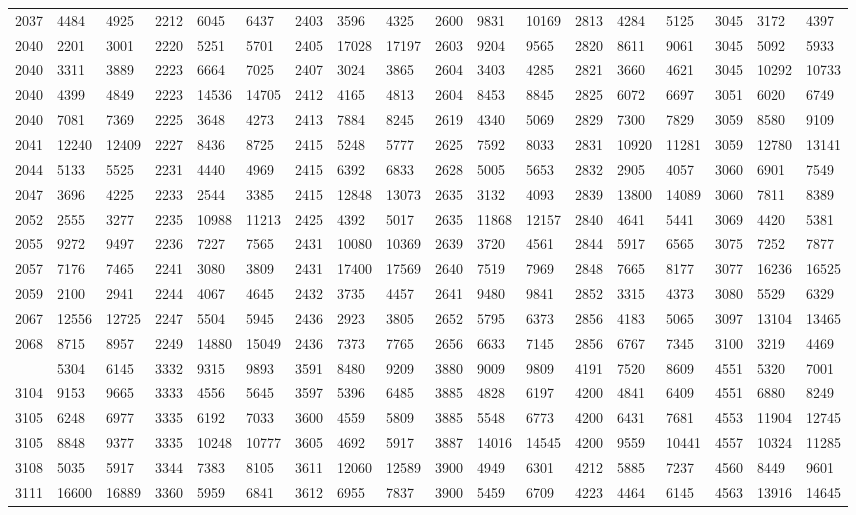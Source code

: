 \begin{center}
\begin{longtable}{*5{A@{\hspace*{5mm}}A}}
2037&4484&4925&2212&6045&6437&2403&3596&4325&2600&9831&10169&2813&4284&5125&3045&3172&4397\\
2040&2201&3001&2220&5251&5701&2405&17028&17197&2603&9204&9565&2820&8611&9061&3045&5092&5933\\
2040&3311&3889&2223&6664&7025&2407&3024&3865&2604&3403&4285&2821&3660&4621&3045&10292&10733\\
2040&4399&4849&2223&14536&14705&2412&4165&4813&2604&8453&8845&2825&6072&6697&3051&6020&6749\\
2040&7081&7369&2225&3648&4273&2413&7884&8245&2619&4340&5069&2829&7300&7829&3059&8580&9109\\
2041&12240&12409&2227&8436&8725&2415&5248&5777&2625&7592&8033&2831&10920&11281&3059&12780&13141\\
2044&5133&5525&2231&4440&4969&2415&6392&6833&2628&5005&5653&2832&2905&4057&3060&6901&7549\\
2047&3696&4225&2233&2544&3385&2415&12848&13073&2635&3132&4093&2839&13800&14089&3060&7811&8389\\
2052&2555&3277&2235&10988&11213&2425&4392&5017&2635&11868&12157&2840&4641&5441&3069&4420&5381\\
2055&9272&9497&2236&7227&7565&2431&10080&10369&2639&3720&4561&2844&5917&6565&3075&7252&7877\\
2057&7176&7465&2241&3080&3809&2431&17400&17569&2640&7519&7969&2848&7665&8177&3077&16236&16525\\
2059&2100&2941&2244&4067&4645&2432&3735&4457&2641&9480&9841&2852&3315&4373&3080&5529&6329\\
2067&12556&12725&2247&5504&5945&2436&2923&3805&2652&5795&6373&2856&4183&5065&3097&13104&13465\\
2068&8715&8957&2249&14880&15049&2436&7373&7765&2656&6633&7145&2856&6767&7345&3100&3219&4469\\
&5304&6145&3332&9315&9893&3591&8480&9209&3880&9009&9809&4191&7520&8609&4551&5320&7001\\
3104&9153&9665&3333&4556&5645&3597&5396&6485&3885&4828&6197&4200&4841&6409&4551&6880&8249\\
3105&6248&6977&3335&6192&7033&3600&4559&5809&3885&5548&6773&4200&6431&7681&4553&11904&12745\\
3105&8848&9377&3335&10248&10777&3605&4692&5917&3887&14016&14545&4200&9559&10441&4557&10324&11285\\
3108&5035&5917&3344&7383&8105&3611&12060&12589&3900&4949&6301&4212&5885&7237&4560&8449&9601\\
3111&16600&16889&3360&5959&6841&3612&6955&7837&3900&5459&6709&4223&4464&6145&4563&13916&14645\\

\end{longtable}
\end{center}
